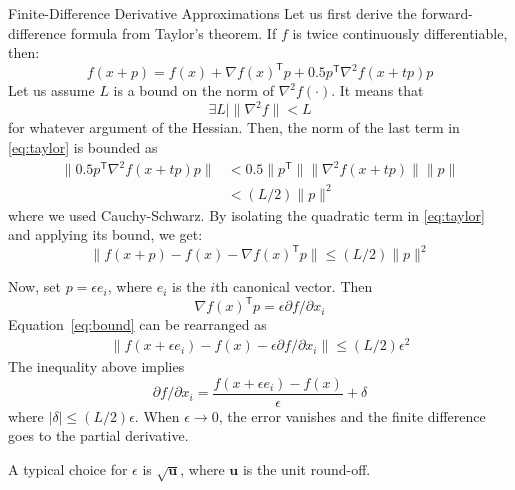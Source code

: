 \documentclass{beamer}
\newcommand{\tran}{\mathsf{T}}
\begin{document}
\begin{frame}[allowframebreaks]{Finite-Difference Derivative Approximations}
	Let us first derive the forward-difference formula from Taylor's theorem. If $f$ is twice continuously differentiable, then:
	\begin{equation} \label{eq:taylor}
		f(x+p) = f(x) + \nabla f(x)^\tran p + 0.5 p^\tran \nabla^2 f(x+tp) p
	\end{equation}
	Let us assume $L$ is a bound on the norm of $\nabla^2 f(\cdot)$. It means that \[\exists L \mid \| \nabla^2 f \| < L\] for whatever argument of the Hessian. Then, the norm of the last term in \eqref{eq:taylor} is bounded as
	\begin{align}
	\|0.5 p^\tran \nabla^2 f(x+tp) p\| &< 0.5 \| p^\tran \| \| \nabla^2 f(x+tp) \| \|p \|\\
	&< (L/2) \|p\|^2
	\end{align}
	where we used Cauchy-Schwarz. By isolating the quadratic term in \eqref{eq:taylor} and applying its bound, we get:
	\begin{equation} \label{eq:bound}
		\| f(x+p) - f(x) - \nabla f(x)^\tran p \| \leq (L/2) \|p\|^2
	\end{equation}
	
	Now, set $p=\epsilon e_i$, where $e_i$ is the $i$th canonical vector. Then \[ \nabla f(x)^\tran p = \epsilon \partial f /\partial x_i\]
	Equation~\eqref{eq:bound} can be rearranged as 
	\begin{gather}
	\| f(x+\epsilon e_i) -f(x) - \epsilon \partial f/\partial x_i\| \leq (L/2) \epsilon^2
	\end{gather}
	The inequality above implies
	\begin{equation}
	\partial f/\partial x_i = \frac{f(x+\epsilon e_i) -f(x)}{\epsilon} + \delta
	\end{equation}
	where $|\delta| \leq (L/2)\epsilon$. When $\epsilon \rightarrow 0$, the error vanishes and the finite difference goes to the partial derivative.
	
	A typical choice for $\epsilon$ is $\sqrt{\mathbf{u}}$, where $\mathbf{u}$ is the unit round-off.
	

\end{frame}
\end{document}
